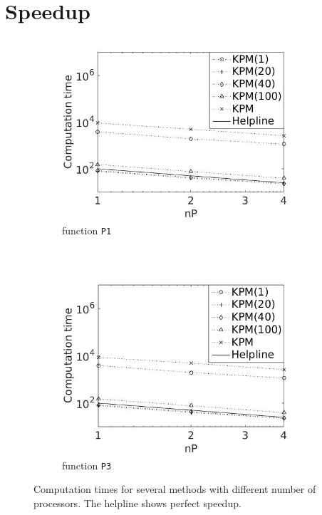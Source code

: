 \section{Speedup} \label{sec:speed}
\begin{figure}[H]
        \centering
        \begin{subfigure}[b]{0.45\textwidth}
                \includegraphics[width=\textwidth]{fig/u1para1}
                \caption{function \texttt{P1}}
                \label{fig:speed1}
        \end{subfigure}%
        ~
        \begin{subfigure}[b]{0.45\textwidth}
                \includegraphics[width=\textwidth]{fig/u2para2}
                \caption{function \texttt{P3}}
                \label{fig:speed2}
        \end{subfigure}
        \caption{Computation times for several methods with different number of processors. The helpline shows perfect speedup.}\label{fig:speed}
        
\end{figure}

